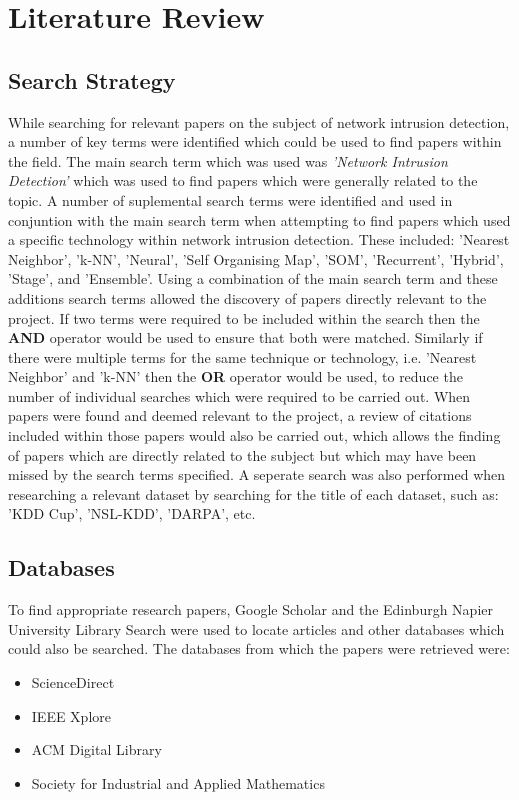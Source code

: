 \newpage
\section{Literature Review}

	\subsection{Search Strategy}
While searching for relevant papers on the subject of network intrusion detection, a number of key terms were identified which could be used to find papers within the field. The main search term which was used was \textit{'Network Intrusion Detection'} which was used to find papers which were generally related to the topic. A number of suplemental search terms were identified and used in conjuntion with the main search term when attempting to find papers which used a specific technology within network intrusion detection. These included: 'Nearest Neighbor', 'k-NN', 'Neural', 'Self Organising Map', 'SOM', 'Recurrent', 'Hybrid', 'Stage', and 'Ensemble'. Using a combination of the main search term and these additions search terms allowed the discovery of papers directly relevant to the project. If two terms were required to be included within the search then the \textbf{AND} operator would be used to ensure that both were matched. Similarly if there were multiple terms for the same technique or technology, i.e. 'Nearest Neighbor' and 'k-NN' then the \textbf{OR} operator would be used, to reduce the number of individual searches which were required to be carried out. When papers were found and deemed relevant to the project, a review of citations included within those papers would also be carried out, which allows the finding of papers which are directly related to the subject but which may have been missed by the search terms specified. A seperate search was also performed when researching a relevant dataset by searching for the title of each dataset, such as: 'KDD Cup', 'NSL-KDD', 'DARPA', etc. 

	\subsection{Databases}
		To find appropriate research papers, Google Scholar and the Edinburgh Napier University Library Search were used to locate articles and other databases which could also be searched. The databases from which the papers were retrieved were:
		\begin{itemize}
			\item ScienceDirect
			\item IEEE Xplore
			\item ACM Digital Library
			\item Society for Industrial and Applied Mathematics
		\end{itemize}
		
